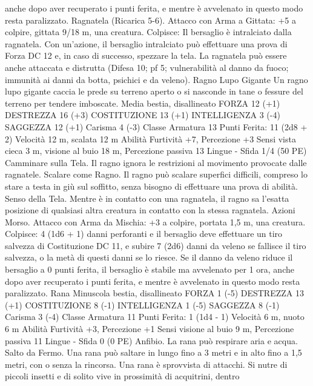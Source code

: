 \begin{multicols}{2}
anche dopo aver recuperato i punti ferita, e mentre è avvelenato
in questo modo resta paralizzato.
Ragnatela (Ricarica 5-6). Attacco con Arma a Gittata: +5 a
colpire, gittata 9/18 m, una creatura.
Colpisce: Il bersaglio è intralciato dalla ragnatela. Con
un’azione, il bersaglio intralciato può effettuare una prova di
Forza DC 12 e, in caso di successo, spezzare la tela. La ragnatela
può essere anche attaccata e distrutta (Difesa 10; pf 5; vulnerabilità
al danno da fuoco; immunità ai danni da botta, psichici e da
veleno).
Ragno Lupo Gigante
Un ragno lupo gigante caccia le prede su terreno aperto
o si nasconde in tane o fessure del terreno per tendere
imboscate.
Media bestia, disallineato
FORZA 12 (+1)
DESTREZZA 16 (+3)
COSTITUZIONE 13 (+1)
INTELLIGENZA 3 (-4)
SAGGEZZA 12 (+1)
Carisma 4 (-3)
Classe Armatura 13
\hspace*{0pt}\hfill{Punti Ferita}: 11 (2d8 + 2)
Velocità 12 m, scalata 12 m
Abilità Furtività +7, Percezione +3
Sensi vista cieca 3 m, visione al buio 18 m, Percezione passiva
13
Lingue -
Sfida 1/4 (50 PE)
Camminare sulla Tela. Il ragno ignora le restrizioni al
movimento provocate dalle ragnatele.
Scalare come Ragno. Il ragno può scalare superfici difficili,
compreso lo stare a testa in giù sul soffitto, senza bisogno di
effettuare una prova di abilità.
Senso della Tela. Mentre è in contatto con una ragnatela, il
ragno sa l’esatta posizione di qualsiasi altra creatura in contatto
con la stessa ragnatela.
Azioni
Morso. Attacco con Arma da Mischia: +3 a colpire, portata 1,5
m, una creatura.
Colpisce: 4 (1d6 + 1) danni perforanti e il bersaglio deve
effettuare un tiro salvezza di Costituzione DC 11, e subire 7
(2d6) danni da veleno se fallisce il tiro salvezza, o la metà di
questi danni se lo riesce. Se il danno da veleno riduce il bersaglio
a 0 punti ferita, il bersaglio è stabile ma avvelenato per 1 ora,
anche dopo aver recuperato i punti ferita, e mentre è avvelenato
in questo modo resta paralizzato.
Rana
Minuscola bestia, disallineato
FORZA 1 (-5)
DESTREZZA 13 (+1)
COSTITUZIONE 8 (-1)
INTELLIGENZA 1 (-5)
SAGGEZZA 8 (-1)
Carisma 3 (-4)
Classe Armatura 11
\hspace*{0pt}\hfill{Punti Ferita}: 1 (1d4 - 1)
Velocità 6 m, nuoto 6 m
Abilità Furtività +3, Percezione +1
Sensi visione al buio 9 m, Percezione passiva 11
Lingue -
Sfida 0 (0 PE)
Anfibio. La rana può respirare aria e acqua.
Salto da Fermo. Una rana può saltare in lungo fino a 3 metri e in
alto fino a 1,5 metri, con o senza la rincorsa.
Una rana è sprovvista di attacchi. Si nutre di piccoli
insetti e di solito vive in prossimità di acquitrini, dentro

\end{multicols}
